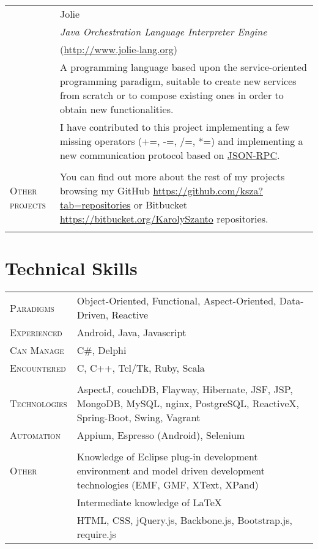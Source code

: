 \documentclass[a4paper,10pt]{article}
\begin{document}
\begin{longtable}{p{2.5cm}|p{11cm}}
 & Jolie\\
 & \emph{Java Orchestration Language Interpreter Engine}\\
 & \footnotesize{(\url{http://www.jolie-lang.org})}\\
 & \footnotesize{A programming language based upon the service-oriented programming paradigm, suitable to create new services from scratch or to compose existing ones in order to obtain new functionalities.}\\

& \footnotesize{I have contributed to this project implementing a
 few missing operators (+=, -=, /=, *=) and implementing a new communication protocol based on \href{http://json-rpc.org/}{JSON-RPC}.}\\ \multicolumn{2}{c}{} \\

 \raggedleft \textsc{Other projects} & You can find out more about the rest of my projects browsing my GitHub \url{https://github.com/ksza?tab=repositories} or Bitbucket \url{https://bitbucket.org/KarolySzanto} repositories.\\ 
 \multicolumn{2}{c}{} \\
\end{longtable}

\section{Technical Skills}
\begin{tabular}{p{2.5cm}p{11cm}}
\textsc{Paradigms} & Object-Oriented, Functional, Aspect-Oriented, Data-Driven, Reactive\\ 
\textsc{Experienced} & Android, Java, Javascript\\
\textsc{Can Manage} & C\#, Delphi\\
\textsc{Encountered} & C, C++, Tcl/Tk, Ruby, Scala\\
\multicolumn{2}{c}{} \\ 
\textsc{Technologies} & AspectJ, couchDB, Flayway, Hibernate, JSF,  JSP,  MongoDB, MySQL, nginx, PostgreSQL, ReactiveX, Spring-Boot, Swing, Vagrant\\
\textsc{Automation} & Appium, Espresso (Android), Selenium\\
 \multicolumn{2}{c}{} \\
 \textsc{Other} & Knowledge of Eclipse plug-in development environment and model
 driven development technologies (EMF, GMF, XText, XPand)\\
 & Intermediate knowledge of \LaTeX \\
 & HTML, CSS, jQuery.js, Backbone.js, Bootstrap.js, require.js\\
\end{tabular}
\end{document}
